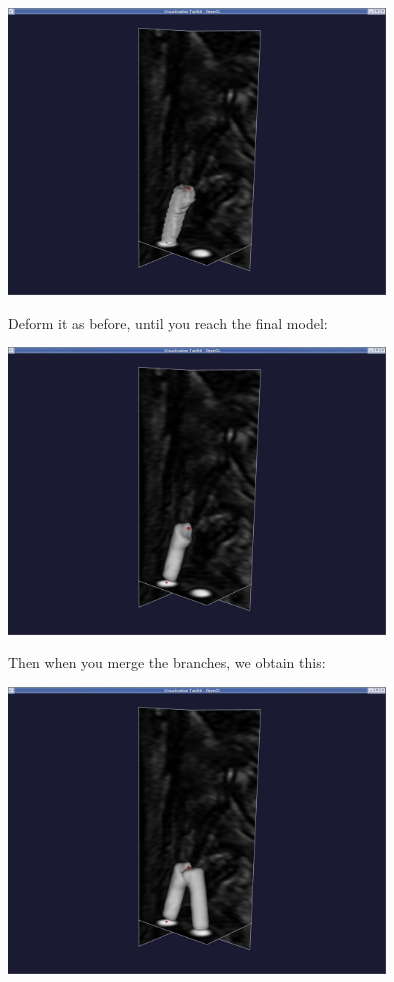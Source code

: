  
\begin{DoxyImageNoCaption}
  \mbox{\includegraphics[width=0.75\textwidth]{deformable_model2}}
\end{DoxyImageNoCaption}


Deform it as before, until you reach the final model\+:

 
\begin{DoxyImageNoCaption}
  \mbox{\includegraphics[width=0.75\textwidth]{curvature1x05}}
\end{DoxyImageNoCaption}


Then when you merge the branches, we obtain this\+:

 
\begin{DoxyImageNoCaption}
  \mbox{\includegraphics[width=0.75\textwidth]{merge_branches}}
\end{DoxyImageNoCaption}


